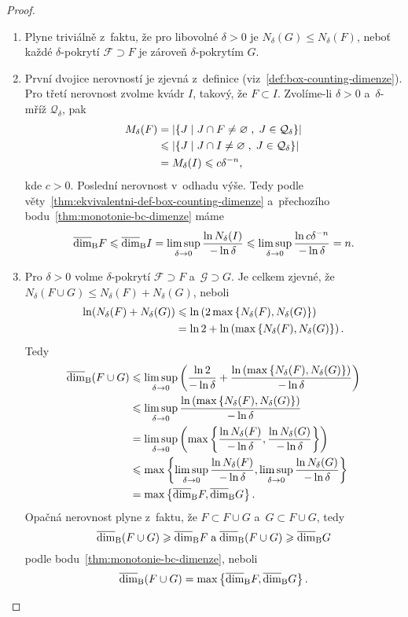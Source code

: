 \begin{proof}
    \begin{enumerate}[label=\textit{(\roman*)}]
        \item Plyne triviálně z~faktu, že pro libovolné $\delta>0$ je $N_\delta(G)\leqslant N_\delta(F)$, neboť každé $\delta$-pokrytí $\mathcal{F}\supset F$ je zároveň $\delta$-pokrytím $G$.
        \item První dvojice nerovností je zjevná z~definice (viz~\ref{def:box-counting-dimenze}). Pro třetí nerovnost zvolme kvádr $I$, takový, že $F\subset I$. Zvolíme-li $\delta>0$ a~$\delta$-mříž $\mathcal{Q}_\delta$, pak
        \begin{align*}
            M_\delta(F)&=\left|\left\{J\;\middle|\;J\cap F\neq\varnothing\;,\;J\in\mathcal{Q}_\delta\right\}\right|\\
            &\leqslant \left|\left\{J\;\middle|\;J\cap I\neq\varnothing\;,\;J\in\mathcal{Q}_\delta\right\}\right|\\
            &=M_\delta(I)\leqslant c\delta^{-n},
        \end{align*}
        kde $c>0$. Poslední nerovnost v~odhadu výše. Tedy podle věty~\ref{thm:ekvivalentni-def-box-counting-dimenze} a~přechozího bodu~\ref{thm:monotonie-bc-dimenze} máme
        \[\overline{\dim}_\textup{B}{F}\leqslant\overline{\dim}_\textup{B}{I}=\limsup_{\delta\to 0}\dfrac{\ln{N_\delta(I)}}{-\ln{\delta}}\leqslant\limsup_{\delta\to 0}\dfrac{\ln{c\delta^{-n}}}{-\ln{\delta}}=n.\]
        \item Pro $\delta>0$ volme $\delta$-pokrytí $\mathcal{F}\supset F$ a~$\mathcal{G}\supset G$. Je celkem zjevné, že $N_\delta(F\cup G)\leqslant N_\delta(F)+N_\delta(G)$, neboli
        \begin{align*}
            \ln(N_\delta(F)+N_\delta(G))&\leqslant \ln\left(2\max\left\{N_\delta(F),N_\delta(G)\right\}\right)\\
            &=\ln{2}+\ln\left(\max\left\{N_\delta(F),N_\delta(G)\right\}\right).
        \end{align*}
        Tedy
        \begin{align*}
            \overline{\dim}_\textup{B}(F\cup G)&\leqslant\limsup_{\delta\to 0}\left(\dfrac{\ln{2}}{-\ln{\delta}}+\dfrac{\ln\left(\max\left\{N_\delta(F),N_\delta(G)\right\}\right)}{-\ln{\delta}}\right)\\
            &\leqslant\limsup_{\delta\to 0}\dfrac{\ln\left(\max\left\{N_\delta(F),N_\delta(G)\right\}\right)}{-\ln{\delta}}\\
            &=\limsup_{\delta\to 0}\left(\max\left\{\dfrac{\ln{N_\delta(F)}}{-\ln{\delta}},\dfrac{\ln{N_\delta(G)}}{-\ln{\delta}}\right\}\right)\\
            &\leqslant\max\left\{\limsup_{\delta\to 0}\dfrac{\ln{N_\delta(F)}}{-\ln{\delta}},\limsup_{\delta\to 0}\dfrac{\ln{N_\delta(G)}}{-\ln{\delta}}\right\}\\
            &=\max\left\{\overline{\dim}_\textup{B}{F},\overline{\dim}_\textup{B}{G}\right\}.
        \end{align*}
        Opačná nerovnost plyne z~faktu, že $F\subset F\cup G$ a~$G\subset F\cup G$, tedy
        \[\overline{\dim}_\textup{B}(F\cup G)\geqslant\overline{\dim}_\textup{B}{F}\;\text{a}\;\overline{\dim}_\textup{B}(F\cup G)\geqslant\overline{\dim}_\textup{B}{G}\]
        podle bodu~\ref{thm:monotonie-bc-dimenze}, neboli
        \[\overline{\dim}_\textup{B}(F\cup G)=\max\left\{\overline{\dim}_\textup{B}{F},\overline{\dim}_\textup{B}{G}\right\}.\]
    \end{enumerate}
\end{proof}
